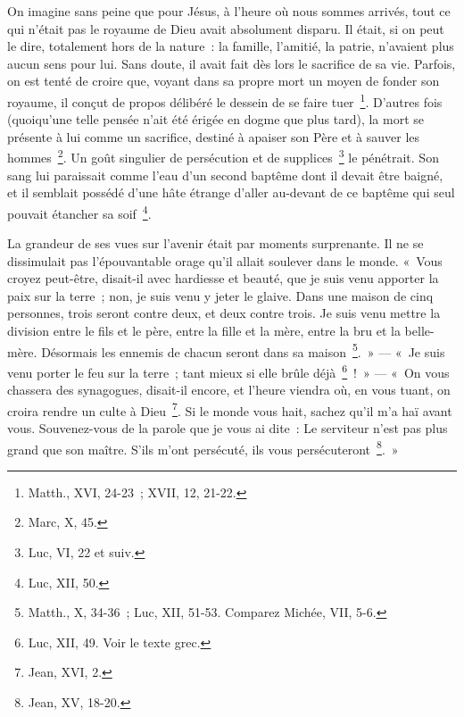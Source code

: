 \documentclass[french,twoside]{book} %
\begin{document}
On imagine sans peine que pour Jésus, à l’heure où nous sommes arrivés, tout ce qui n’était pas le royaume de Dieu avait absolument disparu. Il était, si on peut le dire, totalement hors de la nature : la famille, l’amitié, la patrie, n’avaient plus aucun sens pour lui. Sans doute, il avait fait dès lors le sacrifice de sa vie. Parfois, on est tenté de croire que, voyant dans sa propre mort un moyen de fonder son royaume, il conçut de propos délibéré le dessein de se faire tuer \footnote{Matth., XVI, 24-23 ; XVII, 12, 21-22.}. D’autres fois (quoiqu’une telle pensée n’ait été érigée en dogme que plus tard), la mort se présente à lui comme un sacrifice, destiné à apaiser son Père et à sauver les hommes \footnote{Marc, X, 45.}. Un goût singulier de persécution et de supplices \footnote{Luc, VI, 22 et suiv.} le pénétrait. Son sang lui paraissait comme l’eau d’un second baptême dont il devait être baigné, et il semblait possédé d’une hâte étrange d’aller au-devant de ce baptême qui seul pouvait étancher sa soif \footnote{Luc, XII, 50.}.\par
La grandeur de ses vues sur l’avenir était par moments surprenante. Il ne se dissimulait pas l’épouvantable orage qu’il allait soulever dans le monde. « Vous croyez peut-être, disait-il avec hardiesse et beauté, que je suis venu apporter la paix sur la terre ; non, je suis venu y jeter le glaive. Dans une maison de cinq personnes, trois seront contre deux, et deux contre trois. Je suis venu mettre la division entre le fils et le père, entre la fille et la mère, entre la bru et la belle-mère. Désormais les ennemis de chacun seront dans sa maison \footnote{Matth., X, 34-36 ; Luc, XII, 51-53. Comparez Michée, VII, 5-6.}. » — « Je suis venu porter le feu sur la terre ; tant mieux si elle brûle déjà \footnote{Luc, XII, 49. Voir le texte grec.} ! » — « On vous chassera des synagogues, disait-il encore, et l’heure viendra où, en vous tuant, on croira rendre un culte à Dieu \footnote{Jean, XVI, 2.}. Si le monde vous hait, sachez qu’il m’a haï avant vous. Souvenez-vous de la parole que je vous ai dite : Le serviteur n’est pas plus grand que son maître. S’ils m’ont persécuté, ils vous persécuteront \footnote{Jean, XV, 18-20.}. »\par
\end{document}
